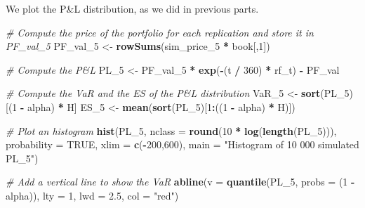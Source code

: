 \documentclass[]{article}
\newenvironment{Shaded}{\begin{snugshade}}{\end{snugshade}}
\newcommand{\CommentTok}[1]{\textcolor[rgb]{0.56,0.35,0.01}{\textit{#1}}}
\newcommand{\DataTypeTok}[1]{\textcolor[rgb]{0.13,0.29,0.53}{#1}}
\newcommand{\DecValTok}[1]{\textcolor[rgb]{0.00,0.00,0.81}{#1}}
\newcommand{\FloatTok}[1]{\textcolor[rgb]{0.00,0.00,0.81}{#1}}
\newcommand{\KeywordTok}[1]{\textcolor[rgb]{0.13,0.29,0.53}{\textbf{#1}}}
\newcommand{\NormalTok}[1]{#1}
\newcommand{\OperatorTok}[1]{\textcolor[rgb]{0.81,0.36,0.00}{\textbf{#1}}}
\newcommand{\OtherTok}[1]{\textcolor[rgb]{0.56,0.35,0.01}{#1}}
\newcommand{\StringTok}[1]{\textcolor[rgb]{0.31,0.60,0.02}{#1}}
\begin{document}
We plot the P\&L distribution, as we did in previous parts.

\begin{Shaded}
\begin{Highlighting}[]
\CommentTok{\# Compute the price of the portfolio for each replication and store it in \textquotesingle{}PF\_val\_5\textquotesingle{}}
\NormalTok{PF\_val\_}\DecValTok{5}\NormalTok{ <{-}}\StringTok{ }\KeywordTok{rowSums}\NormalTok{(sim\_price\_}\DecValTok{5} \OperatorTok{*}\StringTok{ }\NormalTok{book[,}\DecValTok{1}\NormalTok{])}

\CommentTok{\# Compute the P\&L}
\NormalTok{PL\_}\DecValTok{5}\NormalTok{ <{-}}\StringTok{ }\NormalTok{PF\_val\_}\DecValTok{5} \OperatorTok{*}\StringTok{ }\KeywordTok{exp}\NormalTok{(}\OperatorTok{{-}}\NormalTok{(t }\OperatorTok{/}\StringTok{ }\DecValTok{360}\NormalTok{) }\OperatorTok{*}\StringTok{ }\NormalTok{rf\_t) }\OperatorTok{{-}}\StringTok{ }\NormalTok{PF\_val}

\CommentTok{\# Compute the VaR and the ES of the P\&L distribution}
\NormalTok{VaR\_}\DecValTok{5}\NormalTok{ <{-}}\StringTok{ }\KeywordTok{sort}\NormalTok{(PL\_}\DecValTok{5}\NormalTok{)[(}\DecValTok{1} \OperatorTok{{-}}\StringTok{ }\NormalTok{alpha) }\OperatorTok{*}\StringTok{ }\NormalTok{H]}
\NormalTok{ES\_}\DecValTok{5}\NormalTok{  <{-}}\StringTok{ }\KeywordTok{mean}\NormalTok{(}\KeywordTok{sort}\NormalTok{(PL\_}\DecValTok{5}\NormalTok{)[}\DecValTok{1}\OperatorTok{:}\NormalTok{((}\DecValTok{1} \OperatorTok{{-}}\StringTok{ }\NormalTok{alpha) }\OperatorTok{*}\StringTok{ }\NormalTok{H)])}

\CommentTok{\# Plot an histogram}
\KeywordTok{hist}\NormalTok{(PL\_}\DecValTok{5}\NormalTok{, }\DataTypeTok{nclass =} \KeywordTok{round}\NormalTok{(}\DecValTok{10} \OperatorTok{*}\StringTok{ }\KeywordTok{log}\NormalTok{(}\KeywordTok{length}\NormalTok{(PL\_}\DecValTok{5}\NormalTok{))), }
           \DataTypeTok{probability =} \OtherTok{TRUE}\NormalTok{, }\DataTypeTok{xlim =} \KeywordTok{c}\NormalTok{(}\OperatorTok{{-}}\DecValTok{200}\NormalTok{,}\DecValTok{600}\NormalTok{),}
           \DataTypeTok{main =} \StringTok{"Histogram of 10 000 simulated PL\_5"}\NormalTok{)}

\CommentTok{\# Add a vertical line to show the VaR}
\KeywordTok{abline}\NormalTok{(}\DataTypeTok{v   =} \KeywordTok{quantile}\NormalTok{(PL\_}\DecValTok{5}\NormalTok{, }\DataTypeTok{probs =}\NormalTok{ (}\DecValTok{1} \OperatorTok{{-}}\StringTok{ }\NormalTok{alpha)),}
       \DataTypeTok{lty =} \DecValTok{1}\NormalTok{,}
       \DataTypeTok{lwd =} \FloatTok{2.5}\NormalTok{,}
       \DataTypeTok{col =} \StringTok{"red"}\NormalTok{)}
\end{Highlighting}
\end{Shaded}
\end{document}
